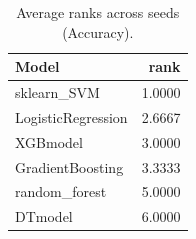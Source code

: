 \begin{table}[t]
\centering
\begin{tabular}{lr}
\toprule
Model & rank \\
\midrule
sklearn_SVM & 1.0000 \\
LogisticRegression & 2.6667 \\
XGBmodel & 3.0000 \\
GradientBoosting & 3.3333 \\
random_forest & 5.0000 \\
DTmodel & 6.0000 \\
\bottomrule
\end{tabular}
\caption{Average ranks across seeds (Accuracy).}
\label{tab:avg_rank_Accuracy}
\end{table}